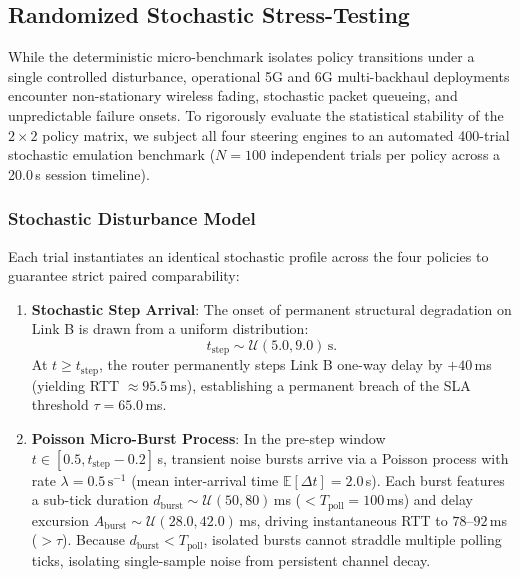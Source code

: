 \subsection{Randomized Stochastic Stress-Testing}
\label{sec:stochastic_eval}

While the deterministic micro-benchmark isolates policy transitions under a single controlled disturbance, operational 5G and 6G multi-backhaul deployments encounter non-stationary wireless fading, stochastic packet queueing, and unpredictable failure onsets. To rigorously evaluate the statistical stability of the $2 \times 2$ policy matrix, we subject all four steering engines to an automated 400-trial stochastic emulation benchmark ($N = 100$ independent trials per policy across a 20.0\,s session timeline).

\subsubsection{Stochastic Disturbance Model}
Each trial instantiates an identical stochastic profile across the four policies to guarantee strict paired comparability:
\begin{enumerate}
    \item \textbf{Stochastic Step Arrival}: The onset of permanent structural degradation on Link B is drawn from a uniform distribution:
    \begin{equation}
        t_{\text{step}} \sim \mathcal{U}(5.0, 9.0)\,\text{s}.
    \end{equation}
    At $t \ge t_{\text{step}}$, the router permanently steps Link B one-way delay by $+40$\,ms (yielding RTT $\approx 95.5$\,ms), establishing a permanent breach of the SLA threshold $\tau = 65.0$\,ms.
    \item \textbf{Poisson Micro-Burst Process}: In the pre-step window $t \in [0.5, t_{\text{step}} - 0.2]$\,s, transient noise bursts arrive via a Poisson process with rate $\lambda = 0.5\,\text{s}^{-1}$ (mean inter-arrival time $\mathbb{E}[\Delta t] = 2.0$\,s). Each burst features a sub-tick duration $d_{\text{burst}} \sim \mathcal{U}(50, 80)$\,ms ($< T_{\text{poll}} = 100$\,ms) and delay excursion $A_{\text{burst}} \sim \mathcal{U}(28.0, 42.0)$\,ms, driving instantaneous RTT to $78\text{--}92$\,ms ($> \tau$). Because $d_{\text{burst}} < T_{\text{poll}}$, isolated bursts cannot straddle multiple polling ticks, isolating single-sample noise from persistent channel decay.
\end{enumerate}

